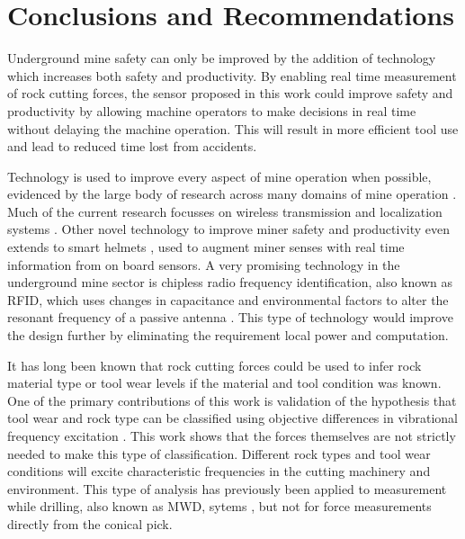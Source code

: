 \chapter{Conclusions and Recommendations
\label{chap:11}}


Underground mine safety can only be improved by the addition of technology which increases both safety and 
productivity. By enabling real time measurement of rock cutting forces, the sensor proposed in this work
could improve safety and productivity by allowing machine operators to make decisions in real time without delaying
the machine operation. This will result in more efficient tool use and lead to reduced time lost from accidents.

Technology is used to improve every aspect of mine operation when possible, evidenced by the large body of 
research across many domains of mine operation \cite{LIU202412}.
Much of the current research focusses on wireless transmission and localization systems \cite{9536741, RayChowdhury2021}.
Other novel technology to improve miner safety and productivity even extends to smart helmets \cite{Sharma2018},
used to augment miner senses with real time information from on board sensors.
A very promising technology in the underground mine sector is chipless radio frequency identification, also known as RFID, which uses changes
in capacitance and environmental factors to alter the resonant frequency of a passive antenna \cite{10081221}.
This type of technology would improve the design further by eliminating the requirement local power and computation.

It has long been known that rock cutting forces could be used to infer rock material type or tool wear levels 
if the material and tool condition was known. 
One of the primary contributions of this work is validation of the hypothesis that tool wear and rock type can be 
classified using objective differences in vibrational frequency excitation \cite{Oltmanns24, oltmanns2023low}.
This work shows that the forces themselves are not strictly needed to make this type of classification. 
Different rock types and tool wear conditions will excite characteristic frequencies in the cutting machinery and environment.
This type of analysis has previously been applied to measurement while drilling, also known as MWD, sytems \cite{LIU202412}, 
but not for force measurements directly from the conical pick. 

